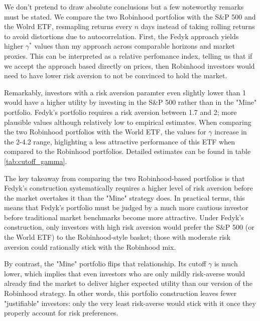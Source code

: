 We don't pretend to draw absolute conclusions but a few noteworthy remarks must be stated.
We compare the two Robinhood portfolios with the S\&P 500 and the Wolrd ETF, resmapling returns every $n$ days instead of taking rolling returns to avoid distortions due to autocorrelation. 
First, the Fedyk approach yields higher $\gamma^*$ values than my approach across comparable horizons and market proxies.
This can be interpreted as a relative perfomance index, telling us that if we accept the approach based directly on prices, then Robinhood investors would need to have lower risk aversion 
to not be convinced to hold the market.

Remarkably, investors with a risk aversion paramter even slightly lower than 1 would have a higher utility by investing in the S\&P 500 rather than in the "Mine" portfolio.
Fedyk's portfolio requires a risk aversion between 1.7 and 2; more plausible values although relatively low to empirical estimates.
When comparing the two Robinhood portfolios with the World ETF, the values for $\gamma$ increase in the 2-4.2 range, 
higlighting a less attractive performance of this ETF when compared to the Robinhood portfolios.
Detailed estimates can be found in table \ref{tab:cutoff_gamma}.

The key takeaway from comparing the two Robinhood-based portfolios is that Fedyk's construction systematically requires a 
higher level of risk aversion before the market overtakes it than the "Mine" strategy does. 
In practical terms, this means that Fedyk's portfolio must be judged by a much more cautious investor before traditional market benchmarks become more attractive. 
Under Fedyk's construction, only investors with high risk aversion would prefer the S\&P 500 (or the World ETF) to the Robinhood-style basket; those with moderate risk aversion could rationally stick with the Robinhood mix.

By contrast, the "Mine" portfolio flips that relationship. 
Its cutoff $\gamma$ is much lower, which implies that even investors who are only mildly risk-averse would already find the market to deliver higher expected utility than our version of the Robinhood strategy. 
In other words, this portfolio construction leaves fewer "justifiable" investors: only the very least risk-averse would stick with it once they properly account for risk preferences.



